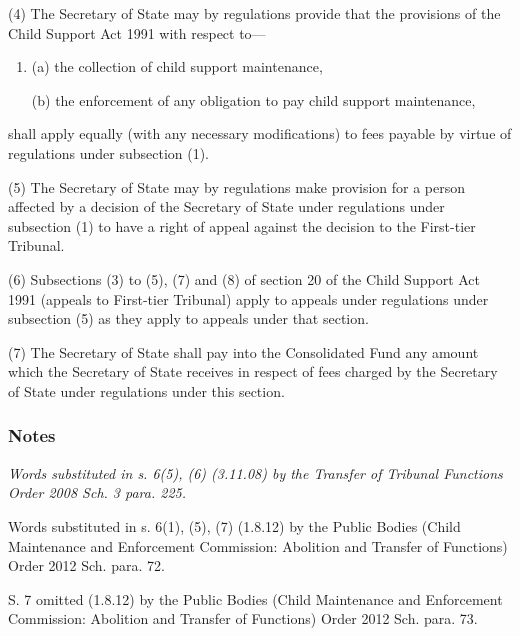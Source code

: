 \documentclass[a4paper]{article}
\newcommand\amendment[1]{\subsubsection*{Notes}{\itshape\frenchspacing\footnotesize #1 \par}}
\begin{document}
(4) The Secretary of State may by regulations provide that the provisions of the Child Support Act 1991 with respect to—
\begin{enumerate}\item[]
(a) the collection of child support maintenance,

(b) the enforcement of any obligation to pay child support maintenance,
\end{enumerate}
shall apply equally (with any necessary modifications) to fees payable by virtue of regulations under subsection (1).

(5) The Secretary of State may by regulations make provision for a person affected by a decision of the Secretary of State under regulations under subsection (1) to have a right of appeal against the decision to the First-tier Tribunal.

(6) Subsections (3) to (5), (7) and (8) of section 20 of the Child Support Act 1991 (appeals to First-tier Tribunal) apply to appeals under regulations under subsection (5) as they apply to appeals under that section.

(7) The Secretary of State shall pay into the Consolidated Fund any amount which the Secretary of State receives in respect of fees charged by the Secretary of State under regulations under this section.

\amendment{
Words substituted in s. 6(5), (6) (3.11.08) by the Transfer of Tribunal Functions Order 2008 Sch. 3 para. 225.

Words substituted in s. 6(1), (5), (7) (1.8.12) by the Public Bodies (Child Maintenance and Enforcement Commission: Abolition and Transfer of Functions) Order 2012 Sch. para. 72.

\medskip

S. 7 omitted (1.8.12) by the Public Bodies (Child Maintenance and Enforcement Commission: Abolition and Transfer of Functions) Order 2012 Sch. para. 73.
}
\end{document}
